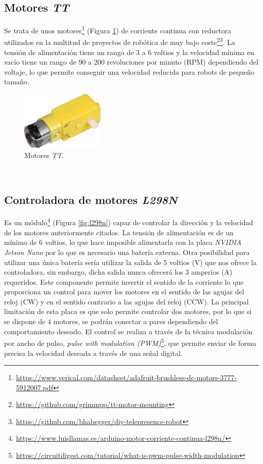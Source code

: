 \subsection{Motores \textit{TT}}
\label{subsection:motortt}
Se trata de unos motores\footnote{\url{https://www.verical.com/datasheet/adafruit-brushless-dc-motors-3777-5912007.pdf}} (Figura \ref{fig:motorTT}) de corriente continua con reductora utilizados en la multitud de proyectos de robótica de muy bajo coste\footnote{\url{https://github.com/grimmpp/tt-motor-mounting}}\footnote{\url{https://github.com/bhabegger/diy-telepresence-robot}}. La tensión de alimentación tiene un rango de 3 a 6 voltios y la velocidad mínima en vacío tiene un rango de 90 a 200 revoluciones por minuto (RPM) dependiendo del voltaje, lo que permite conseguir una velocidad reducida para robots de pequeño tamaño.\\

\begin{figure} [h!]
	\begin{center}
		\includegraphics[width=4cm]{figs/motorTT}
	\end{center}
	\caption{Motores \textit{TT}.}
	\label{fig:motorTT}
\end{figure}\

\subsection{Controladora de motores \textit{L298N}}
\label{subsection:l298n}
Es un módulo\footnote{\url{https://www.luisllamas.es/arduino-motor-corriente-continua-l298n/}} (Figura \ref{fig:l298n}) capaz de controlar la dirección y la velocidad de los motores anteriormente citados. La tensión de alimentación es de un mínimo de 6 voltios, lo que hace imposible alimentarla con la placa \textit{NVIDIA Jetson Nano} por lo que es necesario una batería externa. Otra posibilidad para utilizar una única batería sería utilizar la salida de 5 voltios (V) que nos ofrece la controladora, sin embargo, dicha salida nunca ofrecerá los 3 amperios (A) requeridos. Este componente permite invertir el sentido de la corriente lo que proporciona un control para mover los motores en el sentido de las agujas del reloj (CW) y en el sentido contrario a las agujas del reloj (CCW). La principal limitación de esta placa es que solo permite controlar dos motores, por lo que si se dispone de 4 motores, se podrán conectar a pares dependiendo del comportamiento deseado. El control se realiza a través de la técnica modulación por ancho de pulso, \textit{pulse with modulation (PWM)}\footnote{\url{https://circuitdigest.com/tutorial/what-is-pwm-pulse-width-modulation}}, que permite enviar de forma precisa la velocidad deseada a través de una señal digital.\\

